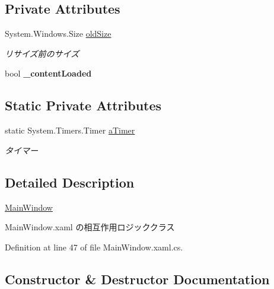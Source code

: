 \subsection*{Private Attributes}
\begin{DoxyCompactItemize}
\item 
\mbox{\label{class_reversi_wpf_1_1_main_window_a6182648ae8a33a62f4f48ef31e9628e2}} 
System.\+Windows.\+Size \hyperlink{class_reversi_wpf_1_1_main_window_a6182648ae8a33a62f4f48ef31e9628e2}{old\+Size}
\begin{DoxyCompactList}\small\item\em リサイズ前のサイズ \end{DoxyCompactList}\item 
\mbox{\label{class_reversi_wpf_1_1_main_window_afb63727d8f663c926c3eaa13330d9903}} 
bool {\bfseries \+\_\+content\+Loaded}
\end{DoxyCompactItemize}
\subsection*{Static Private Attributes}
\begin{DoxyCompactItemize}
\item 
\mbox{\label{class_reversi_wpf_1_1_main_window_ae8295758a928a2a94fa5e0a5e1a75f25}} 
static System.\+Timers.\+Timer \hyperlink{class_reversi_wpf_1_1_main_window_ae8295758a928a2a94fa5e0a5e1a75f25}{a\+Timer}
\begin{DoxyCompactList}\small\item\em タイマー \end{DoxyCompactList}\end{DoxyCompactItemize}


\subsection{Detailed Description}
\hyperlink{class_reversi_wpf_1_1_main_window}{Main\+Window} 

Main\+Window.\+xaml の相互作用ロジッククラス

Definition at line 47 of file Main\+Window.\+xaml.\+cs.



\subsection{Constructor \& Destructor Documentation}
\mbox{\label{class_reversi_wpf_1_1_main_window_af64ecb3857a3d547b4020e9900048360}} 
